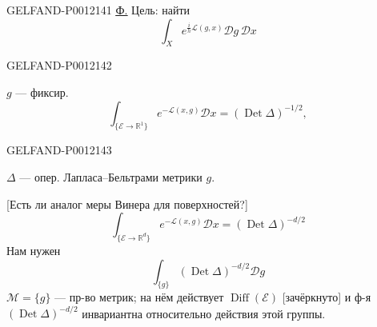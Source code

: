 \begin{GelfandAdjacentEvidence}{GELFAND-P001214}{1}
\underline{\underline{Ф.}} Цель: найти
\begin{equation*}
\int_X e^{\frac ih\mathcal L(g,x)}\mathcal Dg\,\mathcal Dx\tag{2}
\end{equation*}
\end{GelfandAdjacentEvidence}
\begin{GelfandAdjacentEvidence}{GELFAND-P001214}{2}


\(g\) --- фиксир.
\begin{equation*}
\int_{\{\mathcal E\to\mathbb R^1\}}e^{-\mathcal L(x,g)}\mathcal Dx
=(\operatorname{Det}\Delta)^{-1/2},\tag{3}
\end{equation*}
\end{GelfandAdjacentEvidence}
\begin{GelfandAdjacentEvidence}{GELFAND-P001214}{3}

\(\Delta\) --- опер. Лапласа--Бельтрами метрики \(g\).

[Есть ли аналог меры Винера для поверхностей?]
\begin{equation*}
\int_{\{\mathcal E\to\mathbb R^d\}}e^{-\mathcal L(x,g)}\mathcal Dx
=(\operatorname{Det}\Delta)^{-d/2}\tag{4}
\end{equation*}
Нам нужен
\begin{equation*}
\int_{\{g\}}(\operatorname{Det}\Delta)^{-d/2}\mathcal Dg\tag{5}
\end{equation*}
\(\mathcal M=\{g\}\) --- пр-во метрик; на нём действует \(\operatorname{Diff}(\mathcal E)\)
[зачёркнуто] и ф-я \((\operatorname{Det}\Delta)^{-d/2}\) инвариантна относительно действия этой группы.
\end{GelfandAdjacentEvidence}
